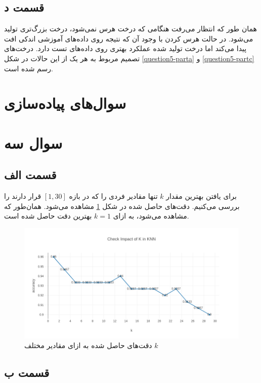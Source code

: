 \documentclass{article}
\begin{document}
\subsection*{قسمت د}

همان طور که انتظار می‌رفت هنگامی که درخت هرس نمی‌شود، درخت بزرگ‌تری تولید می‌شود. در حالت هرس کردن
با وجود آن که نتیجه روی داده‌های آموزشی اندکی افت پیدا می‌کند اما درخت تولید شده عملکرد بهتری
روی داده‌های تست دارد. درخت‌های تصمیم مربوط به هر یک از این حالات در شکل \ref{question5-parta}
و \ref{question5-partc} رسم شده است.

\section*{سوال‌های پیاده‌سازی}

\section*{سوال سه}

\subsection*{قسمت الف}

برای یافتن بهترین مقدار $k$ تنها مقادیر فردی را که در بازه $[1,30]$ قرار دارند را بررسی می‌کنیم.
دقت‌های حاصل شده در شکل \ref{implementation-question1-parta} مشاهده می‌شود. همان‌طور که مشاهده می‌شود،
به ازای $k=1$ بهترین دقت حاصل شده است.


\begin{figure}[h]
    \centering
    \includegraphics[width=\linewidth]{images/implementation/q1/parta.png}
    \caption{دقت‌های حاصل شده به ازای مقادیر مختلف $k$}
    \label{implementation-question1-parta}
\end{figure}

\subsection*{قسمت ب}
\end{document}
